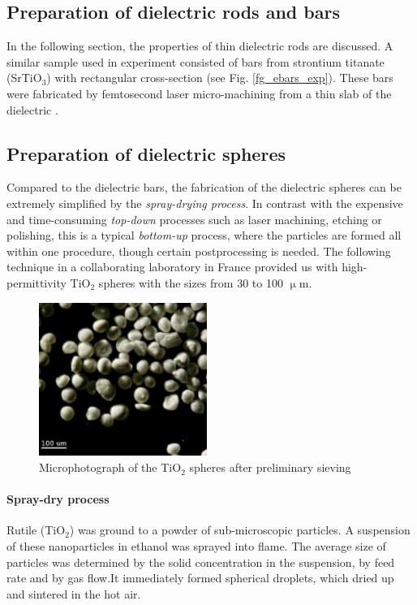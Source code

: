 \subsection{Preparation of dielectric rods and bars}
In the following section, the properties of thin dielectric rods are discussed. A similar sample used in experiment consisted of bars from strontium titanate (SrTiO$_{3}$) with  rectangular cross-section (see Fig. \ref{fg_ebars_exp}). These bars were fabricated by femtosecond laser micro-machining from a thin slab of the dielectric \cite{yahiaoui2011tunable}.

\subsection{Preparation of dielectric spheres}
Compared to the dielectric bars, the fabrication of the dielectric spheres can be extremely simplified by the \textit{spray-drying process}. In contrast with the expensive and time-consuming \textit{top-down} processes such as laser machining, etching or polishing, this is a typical \textit{bottom-up} process, where the particles are formed all within one procedure, though certain postprocessing is needed. The following technique in a collaborating laboratory in France %
provided us with high-permittivity TiO$_{2}$ spheres with the sizes from 30 to 100 $\upmu$m. 

\begin{figure}[ht] \caption{Microphotograph of the TiO$_{2}$ spheres after preliminary sieving} \label{fg_microphoto} \centering 
\includegraphics[height=5cm]{img/microscope_TiO2_particles.pdf}
\end{figure}

\paragraph{Spray-dry process}
Rutile (TiO$_{2}$) was ground to a powder of sub-microscopic particles. 
A suspension of these nanoparticles in ethanol was sprayed into flame. The average size of particles was determined by the solid concentration in the suspension, by feed rate and by gas flow.It immediately formed spherical droplets, which dried up and sintered in the hot air.  

